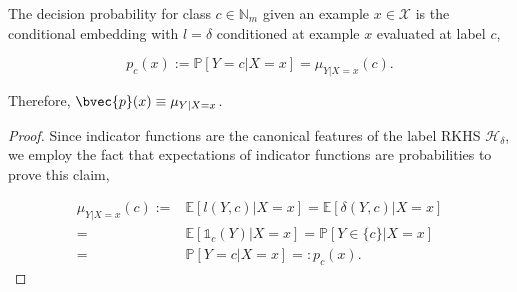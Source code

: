 \documentclass{llncs}
\numberwithin{equation}{section}
\numberwithin{table}{section}
\numberwithin{algorithm}{section}
\begin{document}
	\begin{lemma}
		\label{thm:probability_is_embedding}
		
		The decision probability for class $c \in \mathbb{N}_{m}$ given an example $x \in \mathcal{X}$ is the conditional embedding with $l = \delta$ conditioned at example $x$ evaluated at label $c$,
		
		\begin{equation}
		p_{c}(x) := \mathbb{P}[Y = c | X = x] = \mu_{Y | X = x}(c).
		\end{equation}
		
		Therefore, $\bvec{p}(x) \equiv \mu_{Y | X = x}$.
		
		\begin{proof} 
			
			Since indicator functions are the canonical features of the label \gls{RKHS} $\mathcal{H}_{\delta}$, we employ the fact that expectations of indicator functions are probabilities to prove this claim,
			
			\begin{equation}
			\begin{aligned}
			\mu_{Y | X = x}(c) :=& \mathbb{E}[l(Y, c) | X = x ]= \mathbb{E}[\delta(Y, c) | X = x] \\
			=& \mathbb{E}[\mathbb{1}_{c}(Y) | X = x] = \mathbb{P}[Y \in \{c\} | X = x] \\
			=& \mathbb{P}[Y = c | X = x] =: p_{c}(x).
			\end{aligned}
			\end{equation}
			
		\end{proof}
		
	\end{lemma}
	
\end{document}
